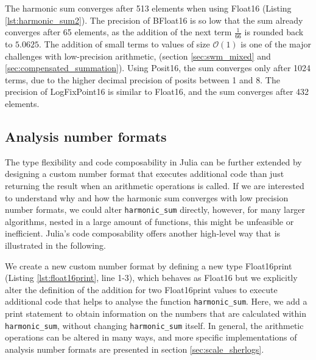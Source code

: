 The harmonic sum converges after 513 elements when using Float16 (Listing \ref{lst:harmonic_sum2}). The precision of BFloat16
is so low that the sum already converges after 65 elements, as the addition of the next term $\tfrac{1}{66}$ is rounded back to
$5.0625$. The addition of small terms to values of size $\mathcal{O}(1)$ is one of the major challenges with low-precision arithmetic,
(section \ref{sec:swm_mixed} and \ref{sec:compensated_summation}). Using Posit16, the sum converges only after 1024 terms,
due to the higher decimal precision of posits between 1 and 8. The precision of LogFixPoint16 is similar to Float16, and the sum
converges after 432 elements.

\subsection{Analysis number formats}
\label{sec:analysis_number_formats}

The type flexibility and code composability in Julia can be further extended by designing a custom number format that executes
additional code than just returning the result when an arithmetic operations is called. If we are interested to understand why and
how the harmonic sum converges with low precision number formats, we could alter \texttt{harmonic\_sum} directly, however,
for many larger algorithms, nested in a large amount of functions, this might be unfeasible or inefficient. Julia's code
composability offers another high-level way that is illustrated in the following.

We create a new custom number format by defining a new type Float16print (Listing \ref{lst:float16print}, line 1-3), which behaves as Float16
but we explicitly alter the definition of the addition for two Float16print values to execute additional code that helps to analyse the
function \texttt{harmonic\_sum}. Here, we add a print statement to obtain information on the numbers that are calculated within 
\texttt{harmonic\_sum}, without changing \texttt{harmonic\_sum} itself. In general, the arithmetic operations can be altered in many ways,
and more specific implementations of analysis number formats are presented in section \ref{sec:scale_sherlogs}.

